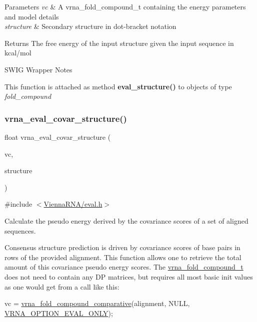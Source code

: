 \begin{DoxyParams}{Parameters}
{\em vc} & A vrna\+\_\+fold\+\_\+compound\+\_\+t containing the energy parameters and model details \\
\hline
{\em structure} & Secondary structure in dot-\/bracket notation \\
\hline
\end{DoxyParams}
\begin{DoxyReturn}{Returns}
The free energy of the input structure given the input sequence in kcal/mol
\end{DoxyReturn}
\begin{DoxyRefDesc}{S\+W\+I\+G Wrapper Notes}
\item[\hyperlink{wrappers__wrappers000031}{S\+W\+I\+G Wrapper Notes}]This function is attached as method {\bfseries eval\+\_\+structure()} to objects of type {\itshape fold\+\_\+compound} \end{DoxyRefDesc}
\mbox{\label{group__eval_ga6cea75c0eb9857fb59172be54cab09e0}} 
\subsubsection{\texorpdfstring{vrna\+\_\+eval\+\_\+covar\+\_\+structure()}{vrna\_eval\_covar\_structure()}}
{\footnotesize\ttfamily float vrna\+\_\+eval\+\_\+covar\+\_\+structure (\begin{DoxyParamCaption}\item[{\hyperlink{group__fold__compound_ga1b0cef17fd40466cef5968eaeeff6166}{vrna\+\_\+fold\+\_\+compound\+\_\+t} $\ast$}]{vc,  }\item[{const char $\ast$}]{structure }\end{DoxyParamCaption})}



{\ttfamily \#include $<$\hyperlink{eval_8h}{Vienna\+R\+N\+A/eval.\+h}$>$}



Calculate the pseudo energy derived by the covariance scores of a set of aligned sequences. 

Consensus structure prediction is driven by covariance scores of base pairs in rows of the provided alignment. This function allows one to retrieve the total amount of this covariance pseudo energy scores. The \hyperlink{group__fold__compound_ga1b0cef17fd40466cef5968eaeeff6166}{vrna\+\_\+fold\+\_\+compound\+\_\+t} does not need to contain any DP matrices, but requires all most basic init values as one would get from a call like this\+: 
\begin{DoxyCode}
vc = \hyperlink{group__fold__compound_gad6bacc816af274922b13d947f708aa0c}{vrna\_fold\_compound\_comparative}(alignment, NULL, 
      \hyperlink{group__fold__compound_ga61469c423131552c8483229f8b6c7e0e}{VRNA\_OPTION\_EVAL\_ONLY});
\end{DoxyCode}


